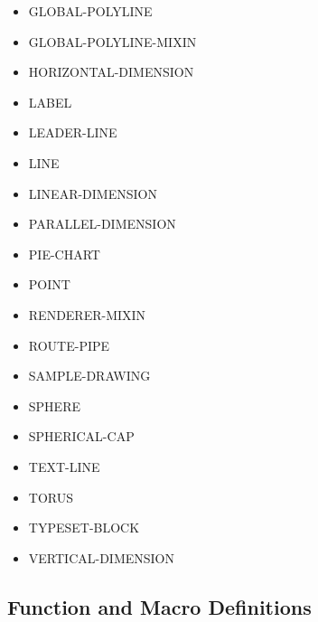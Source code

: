\documentclass [11pt]{book}
\begin{document}
\begin{itemize}
\item {}GLOBAL-POLYLINE

\item {}GLOBAL-POLYLINE-MIXIN

\item {}HORIZONTAL-DIMENSION

\item {}LABEL

\item {}LEADER-LINE

\item {}LINE

\item {}LINEAR-DIMENSION

\item {}PARALLEL-DIMENSION

\item {}PIE-CHART

\item {}POINT

\item {}RENDERER-MIXIN

\item {}ROUTE-PIPE

\item {}SAMPLE-DRAWING

\item {}SPHERE

\item {}SPHERICAL-CAP

\item {}TEXT-LINE

\item {}TORUS

\item {}TYPESET-BLOCK

\item {}VERTICAL-DIMENSION

\end{itemize}



\subsection{Function and Macro Definitions}
\end{document}
